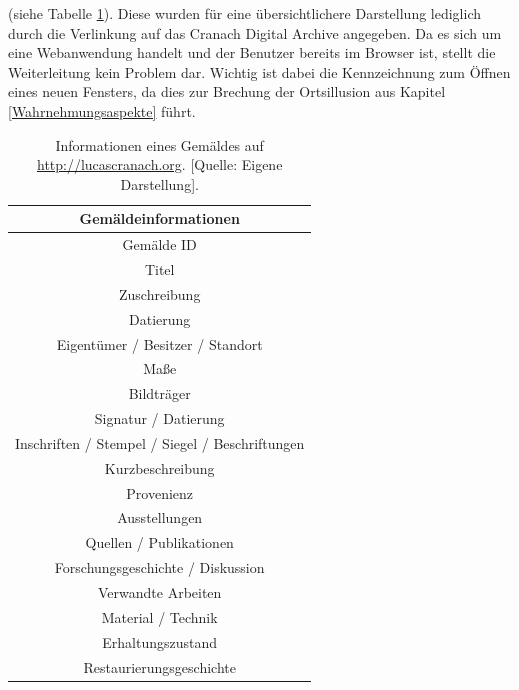 \documentclass[a4paper,12pt,oneside]{article}
\begin{document}
        (siehe Tabelle \ref{tab:gemaeldeinfos}). Diese wurden für eine
        übersichtlichere Darstellung lediglich durch die Verlinkung
        auf das Cranach Digital Archive angegeben. Da es sich um eine Webanwendung
        handelt und der Benutzer bereits im Browser ist, stellt die Weiterleitung
        kein Problem dar. Wichtig ist dabei die Kennzeichnung zum Öffnen eines
        neuen Fensters, da dies zur Brechung der Ortsillusion 
        aus Kapitel \ref{Wahrnehmungsaspekte} führt.
        \begin{table}[h]
          \begin{center}
          \begin{tabular}{| c |}
            \hline
            \textbf{Gemäldeinformationen} \\ \hline
            Gemälde ID \\ \hline
            Titel \\ \hline
            Zuschreibung \\ \hline
            Datierung \\ \hline
            Eigentümer / Besitzer / Standort \\ \hline
            Maße \\ \hline
            Bildträger \\ \hline
            Signatur / Datierung \\ \hline
            Inschriften / Stempel / Siegel / Beschriftungen \\ \hline
            Kurzbeschreibung \\ \hline
            Provenienz \\ \hline
            Ausstellungen \\ \hline
            Quellen / Publikationen \\ \hline
            Forschungsgeschichte / Diskussion \\ \hline
            Verwandte Arbeiten \\ \hline
            Material / Technik \\ \hline
            Erhaltungszustand \\ \hline
            Restaurierungsgeschichte \\ \hline
          \end{tabular}
          \caption[Informationen eines Gemäldes auf \url{http://lucascranach.org}.]{Informationen eines Gemäldes auf \url{http://lucascranach.org}. [Quelle: Eigene Darstellung].\label{tab:gemaeldeinfos}}
          \end{center}
        \end{table} \\
\end{document}

